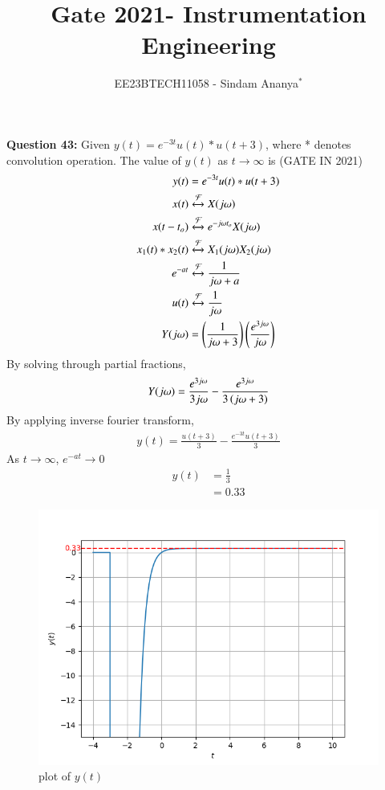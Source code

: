 \documentclass[journal,12pt,twocolumn]{IEEEtran}
\theoremstyle{remark}
\begin{document}

\vspace{3cm}

\title{Gate 2021- Instrumentation Engineering}
\author{EE23BTECH11058 - Sindam Ananya$^{*}$%
}
\maketitle
\newpage
\bigskip

\renewcommand{\thefigure}{\theenumi}
\renewcommand{\thetable}{\theenumi}

\vspace{3cm}
\textbf{Question 43:} 
Given $y(t) = e^{-3t}u(t) * u(t+3)$, where * denotes convolution operation. The value of $y(t)$ as $t \rightarrow \infty$ is
\hfill{(GATE IN 2021)}\\
\solution
\begin{align}
y(t) &=  e^{-3t}u(t) * u(t+3)\\
x(t) &\xleftrightarrow{\mathcal{F}} X(j\omega)\\
x(t-t_o) &\xleftrightarrow{\mathcal{F}} e^{-j\omega t_o}X(j\omega)\\
x_1(t) * x_2(t) &\xleftrightarrow{\mathcal{F}} X_1(j\omega)X_2(j\omega)\\
e^{-at} &\xleftrightarrow{\mathcal{F}} \frac{1}{j\omega + a}\\
u(t) &\xleftrightarrow{\mathcal{F}} \frac{1}{j\omega}\\ 
Y(j\omega) &= \left(\frac{1}{j\omega + 3}\right)\left(\frac{e^{3j\omega}}{j\omega}\right)
\end{align}
By solving through partial fractions,
\begin{align}
Y(j\omega) = \frac{e^{3j\omega}}{3j\omega} - \frac{e^{3j\omega}}{3\left(j\omega+3\right)} 
\end{align}
By applying inverse fourier transform,
\begin{align}
y(t) = \frac{u(t+3)}{3} - \frac{e^{-3t}u(t+3)}{3}
\end{align}
As $t \rightarrow \infty $, $e^{-at} \rightarrow 0$ \quad {}
\begin{align}
y(t) &= \frac{1}{3} \\
     &= 0.33
\end{align}
\begin{figure}[h!]
    \centering
    \includegraphics[width=0.8\columnwidth]{figs/plot.png}
    \caption{plot of $y(t)$}
    \label{fig:gate202138fig}
\end{figure}
\end{document}
